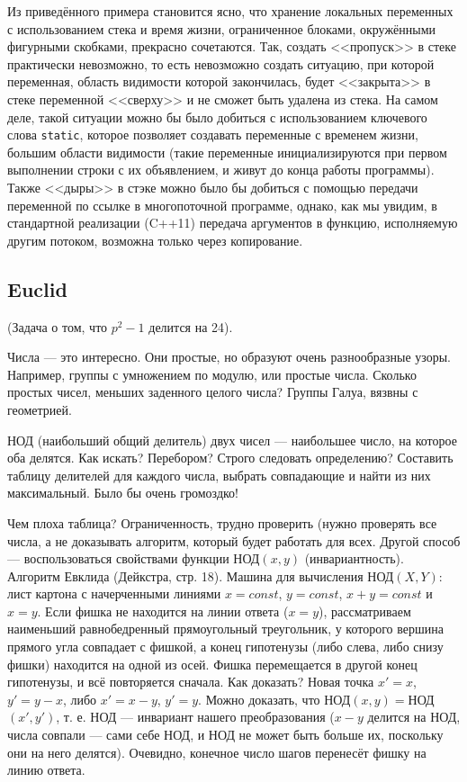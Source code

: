 \documentclass{book}
\begin{document}
\inputminted{cpp}{lifetime.cpp}

Из приведённого примера становится ясно, что хранение локальных переменных с использованием стека и
время жизни, ограниченное блоками, окружёнными фигурными скобками, прекрасно сочетаются. Так,
создать <<пропуск>> в стеке практически невозможно, то есть невозможно создать ситуацию, при
которой переменная, область видимости которой закончилась, будет <<закрыта>> в стеке переменной
<<сверху>> и не сможет быть удалена из стека. На самом деле, такой ситуации можно бы было добиться
с использованием ключевого слова \texttt{static}, которое позволяет создавать переменные с
временем жизни, большим области видимости (такие переменные инициализируются при первом выполнении
строки с их объявлением, и живут до конца работы программы). Также <<дыры>> в стэке можно было бы
добиться с помощью передачи переменной по ссылке в многопоточной программе, однако, как мы увидим,
в стандартной реализации (C++11) передача аргументов в функцию, исполняемую другим потоком,
возможна только через копирование.


\subsection{Euclid}

(Задача о том, что $p^2 - 1$ делится на 24).

Числа  --- это интересно. Они простые, но образуют очень разнообразные узоры. Например, группы с
умножением по модулю, или простые числа. Сколько простых чисел, меньших заденного целого числа?
Группы Галуа, вязвны с геометрией.

НОД (наибольший общий делитель) двух чисел --- наибольшее число, на которое оба делятся. Как
искать? Перебором?
Строго следовать определению? Составить
таблицу делителей для каждого числа, выбрать совпадающие и найти из них максимальный. Было бы очень
громоздко!

Чем плоха
таблица? Ограниченность, трудно проверить (нужно проверять все числа, а не доказывать алгоритм,
который будет работать для всех. Другой способ --- воспользоваться свойствами функции НОД$(x, y)$ (инвариантность).
Алгоритм
Евклида (Дейкстра, стр. 18). Машина для вычисления НОД$(X, Y)$: лист картона с начерченными линиями
$x = const$, $y = const$, $x + y =
const$ и $x = y$. Если фишка не находится на линии ответа ($x = y$), рассматриваем наименьший
равнобедренный прямоугольный треугольник, у которого вершина прямого угла совпадает с фишкой, а
конец гипотенузы (либо слева, либо снизу фишки) находится на одной из осей. Фишка перемещается в
другой конец гипотенузы, и всё повторяется сначала. Как доказать? Новая точка $x' = x$, $y' = y -
x$, либо $x' = x - y$, $y' = y$. Можно доказать, что НОД$(x, y) = $НОД$(x', y')$, т. е. НОД ---
инвариант нашего преобразования ($x - y$ делится на НОД, числа совпали --- сами себе НОД, и НОД не
может быть больше их, поскольку они на него делятся). Очевидно, конечное число шагов перенесёт
фишку на линию ответа.
\end{document}
